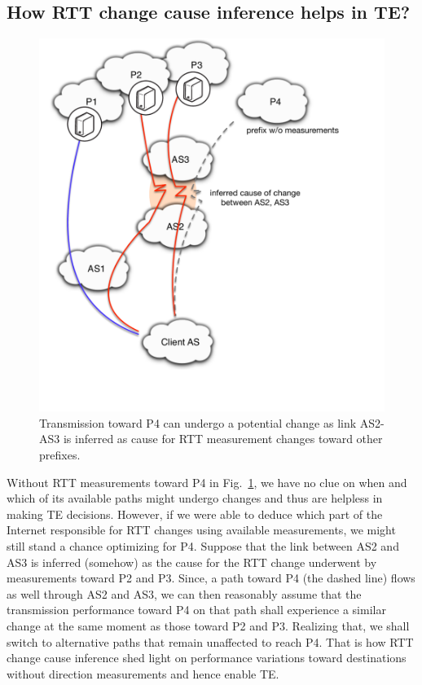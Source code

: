 \subsection{How RTT change cause inference helps in TE?}

\begin{figure}[!htb]
\centering
\includegraphics[width=.7\textwidth]{gfx/chap5/cause_infer_te.pdf}
\caption{Transmission toward P4 can undergo a potential change as link AS2-AS3 is inferred as cause for RTT measurement changes toward other prefixes.}
\label{fig:chap5_cause_infer_te}
\end{figure}

Without RTT measurements toward P4 in Fig.~\ref{fig:chap5_cause_infer_te}, we have no clue on when and which of its available paths might undergo changes and thus are helpless in making TE decisions.
However, if we were able to deduce which part of the Internet responsible for RTT changes using available measurements, we might still stand a chance optimizing for P4.
Suppose that the link between AS2 and AS3 is inferred (somehow) as the cause for the RTT change underwent by measurements toward P2 and P3. 
Since, a path toward P4 (the dashed line) flows as well through AS2 and AS3, we can then reasonably assume that the transmission performance toward P4 on that path shall experience a similar change at the same moment as those toward P2 and P3.
Realizing that, we shall switch to alternative paths that remain unaffected to reach P4.
That is how RTT change cause inference shed light on performance variations toward destinations without direction measurements and hence enable TE.
 
